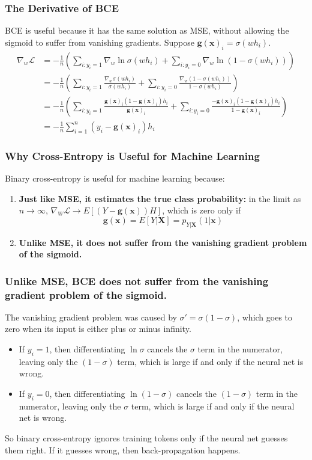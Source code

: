 \begin{frame}
  \frametitle{The Derivative of BCE}

  BCE is useful because it has the same solution as MSE, without
  allowing the sigmoid to suffer from vanishing gradients.  Suppose
  $\mathbf{g}(\mathbf{x})_i=\sigma(wh_i)$.
  \begin{align*}
    \nabla_w{\mathcal L}
    &=
    -\frac{1}{n}
    \left(
    \sum_{i:y_i=1}\nabla_w\ln\sigma(wh_i)
    +\sum_{i:y_i=0}\nabla_w\ln(1-\sigma(wh_i))
    \right)\\
    &=
    -\frac{1}{n}
    \left(
    \sum_{i:y_i=1}\frac{\nabla_w\sigma(wh_i)}{\sigma(wh_i)}
    +\sum_{i:y_i=0}\frac{\nabla_w(1-\sigma(wh_i))}{1-\sigma(wh_i)}
    \right)\\
    &=
    -\frac{1}{n}
    \left(
    \sum_{i:y_i=1}\frac{\mathbf{g}(\mathbf{x})_i(1-\mathbf{g}(\mathbf{x})_i)h_i}{\mathbf{g}(\mathbf{x})_i}
    +\sum_{i:y_i=0}\frac{-\mathbf{g}(\mathbf{x})_i(1-\mathbf{g}(\mathbf{x})_i)h_i}{1-\mathbf{g}(\mathbf{x})_i}
    \right)\\
    &=
    -\frac{1}{n}\sum_{i=1}^n
    \left(y_i-\mathbf{g}(\mathbf{x})_i\right)h_i
  \end{align*}
\end{frame}

\begin{frame}
  \frametitle{Why Cross-Entropy is Useful for Machine Learning}
  Binary cross-entropy is useful for machine learning  because:
  \begin{enumerate}
  \item {\bf Just like MSE, it estimates the true class probability:}
    in the limit as $n\rightarrow\infty$, $\nabla_W{\mathcal
      L}\rightarrow E\left[(Y-\mathbf{g}(\mathbf{x}))H\right]$, which is zero
    only if
    \[
    \mathbf{g}(\mathbf{x})=E\left[Y|\mathbf{X}\right]=p_{Y|\mathbf{X}}(1|\mathbf{x})
    \]
  \item {\bf Unlike MSE, it does not suffer from the vanishing
    gradient problem of the sigmoid.}
  \end{enumerate}
\end{frame}
\begin{frame}
  \frametitle{Unlike MSE, BCE does not suffer from the vanishing
    gradient problem of the sigmoid.}
  The vanishing gradient problem
  was caused by
  $\sigma'=\sigma(1-\sigma)$, which
  goes to zero when its input is either plus or minus infinity.
  \begin{itemize}
  \item If $y_i=1$, then differentiating $\ln\sigma$
    cancels the $\sigma$ term in the numerator, leaving only the
    $(1-\sigma)$ term, which is large if and only if the neural net
    is wrong.
  \item If $y_i=0$, then differentiating $\ln(1-\sigma)$
    cancels the $(1-\sigma)$ term in the numerator, leaving only the
    $\sigma$ term, which is large if and only if the neural net is wrong.
  \end{itemize}
  So binary cross-entropy ignores training tokens only if the neural
  net guesses them right.  If it guesses wrong, then
  back-propagation happens.
\end{frame}

